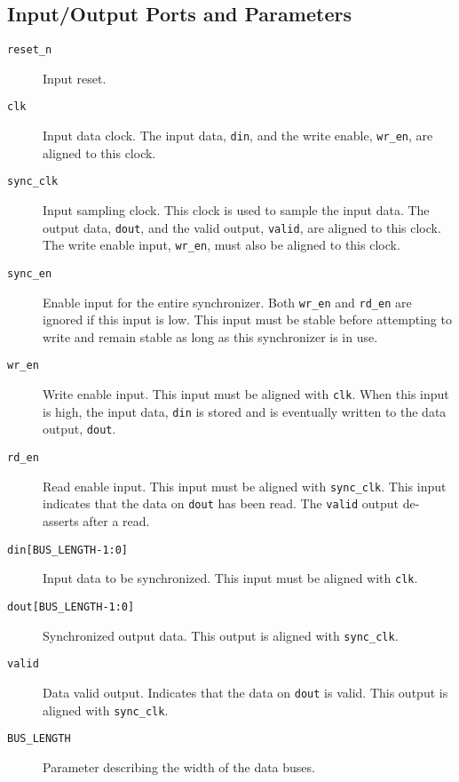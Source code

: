 \subsection{Input/Output Ports and Parameters}
\begin{description}
	\item[\texttt{reset\_n}] Input reset.
	\item[\texttt{clk}] Input data clock. The input data, \texttt{din}, and the write enable, \texttt{wr\_en}, are aligned to this clock.
	\item[\texttt{sync\_clk}] Input sampling clock. This clock is used to sample the input data. The output data, \texttt{dout}, and the valid output, \texttt{valid}, are aligned to this clock. The write enable input, \texttt{wr\_en}, must also be aligned to this clock.
	\item[\texttt{sync\_en}] Enable input for the entire synchronizer. Both \texttt{wr\_en} and \texttt{rd\_en} are ignored if this input is low. This input must be stable before attempting to write and remain stable as long as this synchronizer is in use.
	\item[\texttt{wr\_en}] Write enable input. This input must be aligned with \texttt{clk}. When this input is high, the input data, \texttt{din} is stored and is eventually written to the data output, \texttt{dout}.
	\item[\texttt{rd\_en}] Read enable input. This input must be aligned with \texttt{sync\_clk}. This input indicates that the data on \texttt{dout} has been read. The \texttt{valid} output de-asserts after a read.
	\item[\texttt{din[BUS\_LENGTH-1:0]}] Input data to be synchronized. This input must be aligned with \texttt{clk}.
	\item[\texttt{dout[BUS\_LENGTH-1:0]}] Synchronized output data. This output is aligned with \texttt{sync\_clk}.
	\item[\texttt{valid}] Data valid output. Indicates that the data on \texttt{dout} is valid. This output is aligned with \texttt{sync\_clk}.
	\item[\texttt{BUS\_LENGTH}] Parameter describing the width of the data buses.
\end{description}

